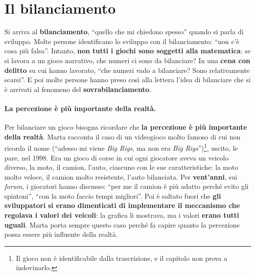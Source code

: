 \section{Il bilanciamento}
\label{a13:sec:bilanciamento}



Si arriva al \textbf{bilanciamento}, ``quello che mi chiedono spesso'' quando si parla di
sviluppo. Molte persone identificano lo sviluppo con il bilanciamento: ``non c'è cosa più
falsa''. Intanto, \textbf{non tutti i giochi sono soggetti alla matematica}: se si lavora a
un gioco narrativo, che numeri ci sono da bilanciare? In una \textbf{cena con delitto} su
cui hanno lavorato, ``che numeri vado a bilanciare? Sono relativamente scarsi''. E poi molte
persone hanno preso così alla lettera l'idea di bilanciare che si è arrivati al fenomeno del
\textbf{sovrabilanciamento}.

\paragraph{La percezione è più importante della realtà.} Per bilanciare un gioco bisogna
ricordare che \textbf{la percezione è più importante della realtà}. Marta racconta il caso di
un videogioco molto famoso di cui non ricorda il nome (``adesso mi viene \emph{Big Rigs}, ma
non era \emph{Big Rigs}'')\footnote{Il gioco non è identificabile dalla trascrizione, e il
capitolo non prova a indovinarlo.}, uscito, le pare, nel 1998. Era un gioco di corse in cui
ogni giocatore aveva un veicolo diverso, la moto, il camion, l'auto, ciascuno con le sue
caratteristiche: la moto molto veloce, il camion molto resistente, l'auto bilanciata. Per
\textbf{vent'anni}, sui \emph{forum}, i giocatori hanno discusso: ``per me il camion è più
adatto perché evito gli spintoni'', ``con la moto faccio tempi migliori''. Poi è saltato fuori
che \textbf{gli sviluppatori si erano dimenticati di implementare il meccanismo che regolava i
valori dei veicoli}: la grafica li mostrava, ma i valori \textbf{erano tutti uguali}. Marta
porta sempre questo caso perché fa capire quanto la percezione possa essere più influente
della realtà.

